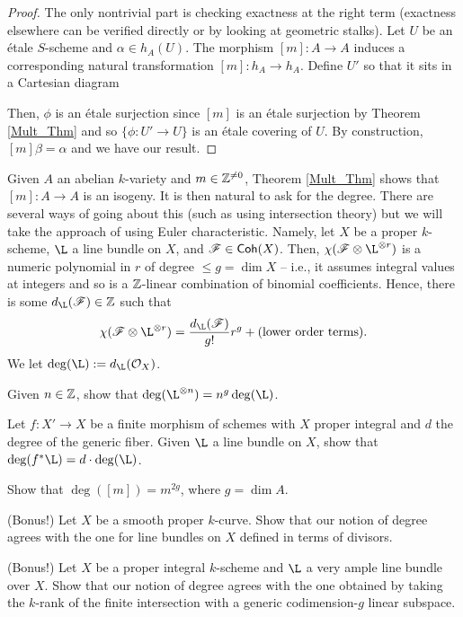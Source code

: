 \documentclass[11pt]{article}
\newcommand{\F}{\mathscr{F}}
\begin{document}
\begin{proof}
The only nontrivial part is checking exactness at the right term (exactness elsewhere can be verified directly or by looking at geometric stalks). Let $U$ be an \'{e}tale $S$-scheme and $\alpha\in h_A(U)$. The morphism $[m]: A\to A$ induces a corresponding natural transformation $[m]: h_A\to h_A$. Define $U'$ so that it sits in a Cartesian diagram
\begin{center}
\end{center}
Then, $\phi$ is an \'{e}tale surjection since $[m]$ is an \'{e}tale surjection by Theorem \ref{Mult_Thm} and so $\{\phi: U'\to U\}$ is an \'{e}tale covering of $U$. By construction, $[m]\beta=\alpha$ and we have our result. \qedhere
\end{proof}

\begin{exercise}
Given $A$ an abelian $k$-variety and $m\in\mathbb{Z}^{\neq0}$, Theorem \ref{Mult_Thm} shows that $[m]: A\to A$ is an isogeny. It is then natural to ask for the degree. There are several ways of going about this (such as using intersection theory) but we will take the approach of using Euler characteristic. Namely, let $X$ be a proper $k$-scheme, $\L$ a line bundle on $X$, and $\F\in\Coh(X)$. Then, $\chi(\F\tensor\L^{\tensor r})$ is a numeric polynomial in $r$ of degree $\leq g=\dim X$ -- i.e., it assumes integral values at integers and so is a $\mathbb{Z}$-linear combination of binomial coefficients. Hence, there is some $d_{\L}(\F)\in\Z$ such that 
$$\chi(\F\tensor\L^{\tensor r})=\df{d_{\L}(\F)}{g!}r^g+(\textrm{lower order terms}).$$
We let $\deg(\L):=d_{\L}(\O_X)$.

\begin{enum}{\arabic}
\item Given $n\in\mathbb{Z}$, show that $\deg(\L^{\tensor n})=n^g\deg(\L)$.

\item Let $f: X'\to X$ be a finite morphism of schemes with $X$ proper integral and $d$ the degree of the generic fiber. Given $\L$ a line bundle on $X$, show that $\deg(f^*\L)=d\cdot\deg(\L)$.

\item Show that $\deg([m])=m^{2g}$, where $g=\dim A$.

\item[\textup{(Bonus!)}] Let $X$ be a smooth proper $k$-curve. Show that our notion of degree agrees with the one for line bundles on $X$ defined in terms of divisors. 

\item[\textup{(Bonus!)}] Let $X$ be a proper integral $k$-scheme and $\L$ a very ample line bundle over $X$. Show that our notion of degree agrees with the one obtained by taking the $k$-rank of the finite intersection with a generic codimension-$g$ linear subspace. 
\end{enum}
\end{exercise}
\end{document}
